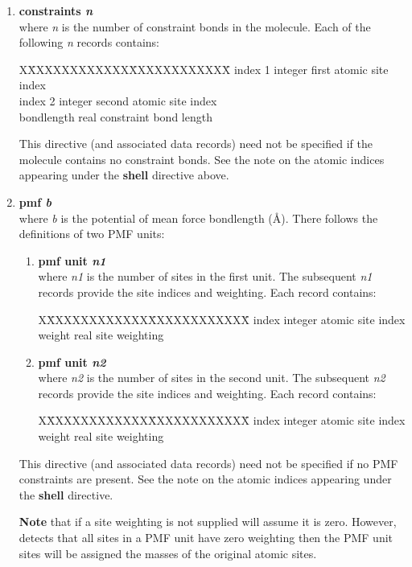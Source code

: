 \begin{enumerate}
\item {\bf constraints {\em n}} \\
where {\em n} is the number of constraint bonds in the molecule.
Each of the following {\em n} records contains:
\begin{tabbing}
X\=XXXXXXXXXXXX\=XXXXXXXXXXXX\=\kill
\> index 1    \> integer \> first atomic site index \\
\> index 2    \> integer \> second atomic site index \\
\> bondlength \> real    \> constraint bond length
\end{tabbing}
This directive (and associated data records) need not be specified
if the molecule contains no constraint
bonds.  See the note on the atomic indices
appearing under the {\bf shell} directive above.

\item {\bf pmf {\em b}} \\
where {\em b} is the potential of mean force bondlength (\AA).
There follows the definitions of two PMF units:
\begin{enumerate}
\item {\bf pmf unit {\em n1}} \\
where {\em n1} is the number of sites in the first unit.  The subsequent
{\em n1} records provide the site indices and weighting.  Each record contains:
\begin{tabbing}
X\=XXXXXXXXXXXX\=XXXXXXXXXXXX\=\kill
\> index      \> integer \> atomic site index \\
\> weight     \> real    \> site weighting
\end{tabbing}
\item {\bf pmf unit {\em n2}} \\
where {\em n2} is the number of sites in the second unit.  The subsequent
{\em n2} records provide the site indices and weighting.  Each record contains:
\begin{tabbing}
X\=XXXXXXXXXXXX\=XXXXXXXXXXXX\=\kill
\> index      \> integer \> atomic site index \\
\> weight     \> real    \> site weighting
\end{tabbing}
\end{enumerate}
This directive (and associated data records) need not be specified
if no PMF constraints are present.  See the
note on the atomic indices appearing under the {\bf shell} directive.

{\bf Note} that if a site weighting is not supplied \D will assume
it is zero.  However, \D detects that all sites in a PMF unit have
zero weighting then the PMF unit sites will be assigned the masses
of the original atomic sites.


\end{enumerate}
